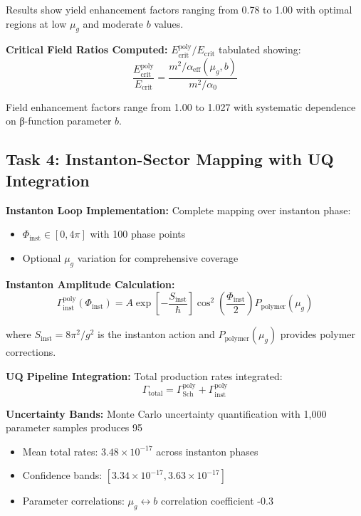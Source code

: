 \documentclass[11pt]{article}
\begin{document}
Results show yield enhancement factors ranging from 0.78 to 1.00 with optimal regions at low $\mu_g$ and moderate $b$ values.

\textbf{Critical Field Ratios Computed:} $E_{\text{crit}}^{\text{poly}}/E_{\text{crit}}$ tabulated showing:
\begin{equation}
\frac{E_{\text{crit}}^{\text{poly}}}{E_{\text{crit}}} = \frac{m^2/\alpha_{\text{eff}}(\mu_g, b)}{m^2/\alpha_0}
\end{equation}

Field enhancement factors range from 1.00 to 1.027 with systematic dependence on β-function parameter $b$.

\subsection{Task 4: Instanton-Sector Mapping with UQ Integration}

\textbf{Instanton Loop Implementation:} Complete mapping over instanton phase:
\begin{itemize}
    \item $\Phi_{\text{inst}} \in [0, 4\pi]$ with 100 phase points
    \item Optional $\mu_g$ variation for comprehensive coverage
\end{itemize}

\textbf{Instanton Amplitude Calculation:}
\begin{equation}
\Gamma_{\text{inst}}^{\text{poly}}(\Phi_{\text{inst}}) = A \exp\left[-\frac{S_{\text{inst}}}{\hbar}\right] \cos^2\left(\frac{\Phi_{\text{inst}}}{2}\right) P_{\text{polymer}}(\mu_g)
\end{equation}

where $S_{\text{inst}} = 8\pi^2/g^2$ is the instanton action and $P_{\text{polymer}}(\mu_g)$ provides polymer corrections.

\textbf{UQ Pipeline Integration:} Total production rates integrated:
\begin{equation}
\Gamma_{\text{total}} = \Gamma_{\text{Sch}}^{\text{poly}} + \Gamma_{\text{inst}}^{\text{poly}}
\end{equation}

\textbf{Uncertainty Bands:} Monte Carlo uncertainty quantification with 1,000 parameter samples produces 95%
\begin{itemize}
    \item Mean total rates: $3.48 \times 10^{-17}$ across instanton phases
    \item Confidence bands: $[3.34 \times 10^{-17}, 3.63 \times 10^{-17}]$
    \item Parameter correlations: $\mu_g \leftrightarrow b$ correlation coefficient -0.3
\end{itemize}
\end{document}
